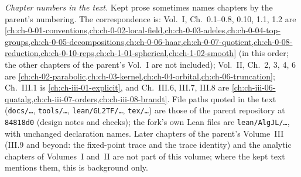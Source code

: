 \noindent\emph{Chapter numbers in the text.} Kept prose sometimes names chapters by the parent's numbering. The
correspondence is: Vol.~I, Ch.~0.1--0.8, 0.10, 1.1, 1.2 are
\cref{ch:ch-0-01-conventions,ch:ch-0-02-local-field,ch:ch-0-03-adeles,ch:ch-0-04-top-groups,ch:ch-0-05-decompositions,ch:ch-0-06-haar,ch:ch-0-07-quotient,ch:ch-0-08-reduction,ch:ch-0-10-reps,ch:ch-1-01-spherical,ch:ch-1-02-smooth}
(in this order; the other chapters of the parent's Vol.~I are not included); Vol.~II,
Ch.~2, 3, 4, 6 are \cref{ch:ch-02-parabolic,ch:ch-03-kernel,ch:ch-04-orbital,ch:ch-06-truncation}; Ch.~III.1 is
\cref{ch:ch-iii-01-explicit}, and Ch.~III.6, III.7, III.8 are \cref{ch:ch-iii-06-quatalg,ch:ch-iii-07-orders,ch:ch-iii-08-brandt}.
File paths quoted in the text (\texttt{docs/\dots}, \texttt{tools/\dots}, \texttt{lean/GL2TF/\dots},
\texttt{tex/\dots}) are those of the parent repository at \texttt{84818d0} (design notes and checks); the fork's own Lean files are
\texttt{lean/AlgJL/\dots}, with unchanged declaration names. Later chapters of the parent's Volume~III (III.9 and beyond: the fixed-point trace and the trace identity) and
the analytic chapters of Volumes~I and~II are not part of this volume; where the kept text mentions them, this
is background only.
